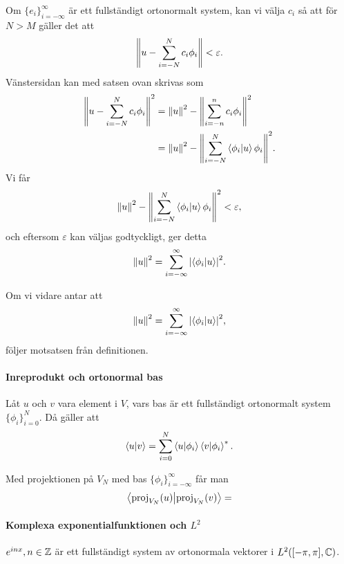 \proof
Om $\{e_{i}\}_{i = -\infty}^{\infty}$ är ett fullständigt ortonormalt system, kan vi välja $c_{i}$ så att för $N > M$ gäller det att
\begin{align*}
	\norm{u - \sum\limits_{i = -N}^{N}c_{i}\phi_{i}} < \varepsilon.
\end{align*}
Vänstersidan kan med satsen ovan skrivas som
\begin{align*}
	\norm{u - \sum\limits_{i = -N}^{N}c_{i}\phi_{i}}^{2} &= \norm{u}^{2} - \norm{\sum\limits_{i = -n}^{n}c_{i}\phi_{i}}^{2} \\
	                                                    &= \norm{u}^{2} - \norm{\sum\limits_{i = -N}^{N}\bra{\phi_{i}}\ket{u}\phi_{i}}^{2}.
\end{align*}
Vi får
\begin{align*}
	\norm{u}^{2} - \norm{\sum\limits_{i = -N}^{N}\bra{\phi_{i}}\ket{u}\phi_{i}}^{2} < \varepsilon,
\end{align*}
och eftersom $\varepsilon$ kan väljas godtyckligt, ger detta
\begin{align*}
	\norm{u}^{2} = \sum\limits_{i = -\infty}^{\infty}\abs{\bra{\phi_{i}}\ket{u}}^{2}.
\end{align*}

Om vi vidare antar att
\begin{align*}
	\norm{u}^{2} = \sum\limits_{i = -\infty}^{\infty}\abs{\bra{\phi_{i}}\ket{u}}^{2},
\end{align*}
följer motsatsen från definitionen.

\paragraph{Inreprodukt och ortonormal bas}
Låt $u$ och $v$ vara element i $V$, vars bas är ett fullständigt ortonormalt system $\{\phi_{i}\}_{i = 0}^{N}$. Då gäller att
\begin{align*}
	\bra{u}\ket{v} = \sum\limits_{i = 0}^{N}\bra{u}\ket{\phi_{i}}\bra{v}\ket{\phi_{i}}^{*}.
\end{align*}

\proof
Med projektionen på $V_{N}$ med bas $\{\phi_{i}\}_{i = -\infty}^{\infty}$ får man
\begin{align*}
	\bra{\text{proj}_{V_{N}}(u)}\ket{\text{proj}_{V_{N}}(v)} = 
\end{align*}

\paragraph{Komplexa exponentialfunktionen och $L^{2}$}
$e^{inx}, n\in\mathbb{Z}$ är ett fullständigt system av ortonormala vektorer i $L^{2}([-\pi, \pi], \mathbb{C})$.

